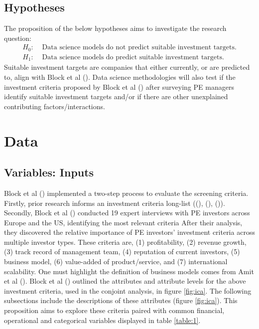 \documentclass[12pt]{article}
\begin{document}
\subsection{Hypotheses}
The proposition of the below hypotheses aims to investigate the research question:
\begin{align}
	H_0:& \text{ Data science models do not predict suitable investment targets.}\\
	H_1:& \text{ Data science models do predict suitable investment targets.}
\end{align}
Suitable investment targets are companies that either currently, or are predicted to, align with Block et al (\citeyear{BLOCK2019329}).
Data science methodologies will also test if the investment criteria proposed by Block et al (\citeyear{BLOCK2019329}) after surveying PE managers identify suitable investment targets
and/or if there are other unexplained contributing factors/interactions.
\section{Data}\label{data}
\subsection{Variables: Inputs}\label{var}
Block et al (\citeyear{BLOCK2019329}) implemented a two-step process to evaluate the screening criteria.
Firstly, prior research informs an investment criteria long-list ((\cite{bernstein2017attracting}), (\cite{VCEST}), (\cite{LCVC})).
Secondly, Block et al (\citeyear{BLOCK2019329}) conducted 19 expert interviews with PE investors across Europe and the US, identifying the most relevant criteria
After their analysis, they discovered the relative importance of PE investors' investment criteria across multiple investor types.
These criteria are, (1) profitability, (2) revenue growth, (3) track record of management team, (4) reputation of current investors, (5) business model, (6) value-added of product/service, and (7) international scalability.
One must highlight the definition of business models comes from Amit et al (\citeyear{Amit2001493}).
Block et al (\citeyear{BLOCK2019329}) outlined the attributes and attribute levels for the above investment criteria, used in the conjoint analysis, in figure \ref{fig:ica}.
The following subsections include the descriptions of these attributes (figure \ref{fig:ica}).
This proposition aims to explore these criteria paired with common financial, operational and categorical variables displayed in table \ref{table:1}.
\end{document}
